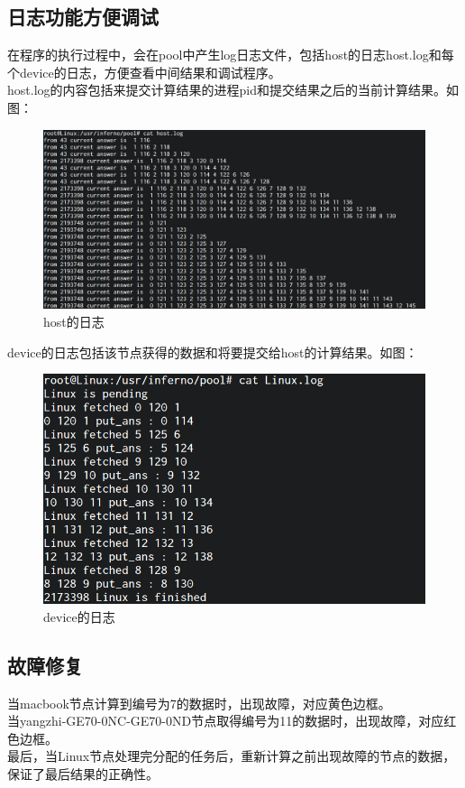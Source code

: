 \documentclass[paper=a4]{ctexart} %
\numberwithin{equation}{section} %
\numberwithin{figure}{section} %
\numberwithin{table}{section} %
\newcommand{\n}{\\\indent}
\begin{document}
\subsection{日志功能方便调试}
 在程序的执行过程中，会在pool中产生log日志文件，包括host的日志host.log和每个device的日志，方便查看中间结果和调试程序。\n
    host.log的内容包括来提交计算结果的进程pid和提交结果之后的当前计算结果。如图：

    \begin{figure}[htbp]
      \centering
      \includegraphics[width=1\textwidth]{pic/hostlog.png}
      \caption{host的日志}
    \end{figure}

    device的日志包括该节点获得的数据和将要提交给host的计算结果。如图：

\begin{figure}[htbp]
\centering
\includegraphics[width=1\textwidth]{pic/devicelog.png}
\caption{device的日志}
\end{figure}

\clearpage

\subsection{故障修复}
当macbook节点计算到编号为7的数据时，出现故障，对应黄色边框。\n
当yangzhi-GE70-0NC-GE70-0ND节点取得编号为11的数据时，出现故障，对应红色边框。\n
最后，当Linux节点处理完分配的任务后，重新计算之前出现故障的节点的数据，保证了最后结果的正确性。\n
\end{document}
